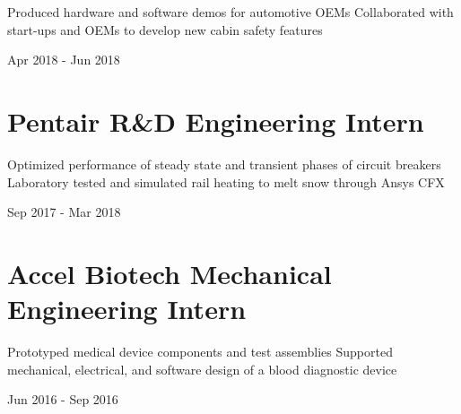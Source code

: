 \documentclass[letterpaper,10pt,oneside]{article}
\begin{document}
\begin{body}
\BulletItem
\vspace{-2.5ex}
\begin{detail}
\BulletItem
 Produced hardware and software demos for automotive OEMs
\BulletItem
 Collaborated with start-ups and OEMs to develop new cabin safety features
\end{detail}

\begin{subtitle}
\vspace{-7.8ex}
{{Apr 2018 - Jun 2018}}
\end{subtitle}
\vspace{0ex}

\section
{\textbf{Pentair}
\newline
R\&D Engineering Intern}

\BulletItem
\vspace{-2.5ex}
\begin{detail}

\BulletItem
 Optimized performance of steady state and transient phases of circuit breakers
\BulletItem
 Laboratory tested and simulated rail heating to melt snow through Ansys CFX 
\end{detail}

\begin{subtitle}
\vspace{-7.8ex}
{{Sep 2017 - Mar 2018}}
\end{subtitle}
\vspace{0ex}


\section
{\textbf{Accel Biotech}
\newline
Mechanical Engineering Intern}

\BulletItem
\vspace{-2.5ex}
\begin{detail}
\BulletItem
Prototyped medical device components and test assemblies
\BulletItem
Supported mechanical, electrical, and software design of a blood diagnostic device
\end{detail}

\begin{subtitle}
\vspace{-7.8ex}
{{Jun 2016 - Sep 2016}}
\end{subtitle}
\vspace{0ex}


\end{body}
\end{document}
